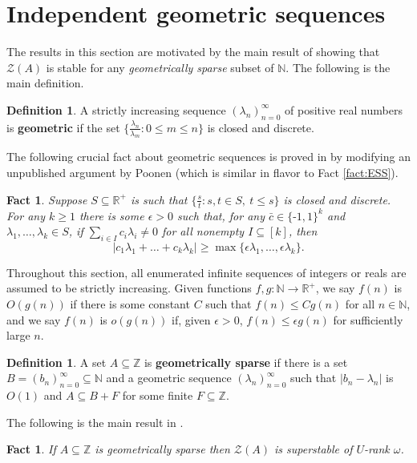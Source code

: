 \documentclass{amsart}
\def\seq{\subseteq}
\newcommand{\nv}{\text{-}}
\newcommand{\cbar}{\bar{c}}
\newcommand{\cZ}{\mathcal{Z}}
\def\N{\mathbb N}
\def\R{\mathbb R}
\def\Z{\mathbb Z}
\newtheorem{fact}[theorem]{Fact}
\theoremstyle{definition}
\newtheorem{definition}[theorem]{Definition}
\begin{document}
\section{Independent geometric sequences}

The results in this section are motivated by the main result of \cite{CoSS} showing that $\cZ(A)$ is stable for any \emph{geometrically sparse} subset of $\N$. The following is the main definition.

\begin{definition}\cite{CoSS}
A strictly increasing sequence $(\lambda_n)_{n=0}^\infty$ of positive real numbers is \textbf{geometric} if the set $\{\frac{\lambda_n}{\lambda_m}:0\leq m\leq n\}$ is closed and discrete.
\end{definition}

The following crucial fact about geometric sequences is proved in \cite[Lemma 7.3]{CoSS} by modifying an unpublished argument by Poonen (which is similar in flavor to Fact \ref{fact:ESS}).

\begin{fact}\label{fact:Poon}
Suppose $S\seq\R^+$ is such that $\{\frac{s}{t}:s,t\in S,~t\leq s\}$ is closed and discrete. For any $k\geq 1$ there is some $\epsilon>0$ such that, for any $\cbar\in\{\nv 1,1\}^k$ and $\lambda_1,\ldots,\lambda_k\in S$, if $\sum_{i\in I}c_i\lambda_i\neq 0$ for all nonempty $I\seq[k]$, then 
\[
|c_1\lambda_1+\ldots+c_k\lambda_k|\geq \max\{\epsilon\lambda_1,\ldots,\epsilon\lambda_k\}.
\]
\end{fact}


Throughout this section, all enumerated infinite sequences of integers or reals are assumed to be strictly increasing. Given functions $f,g:\N\to\R^+$, we say $f(n)$ is $O(g(n))$ if there is some constant $C$ such that $f(n)\leq Cg(n)$ for all $n\in\N$, and we say $f(n)$ is $o(g(n))$ if, given $\epsilon>0$, $f(n)\leq \epsilon g(n)$ for sufficiently large $n$. 

\begin{definition}\label{def:gs}\cite{CoSS}
A set $A\seq\Z$ is \textbf{geometrically sparse} if there is a set $B=(b_n)_{n=0}^\infty\seq\N$ and a geometric sequence $(\lambda_n)_{n=0}^\infty$ such that $|b_n-\lambda_n|$ is $O(1)$ and $A\seq B+F$ for some finite $F\seq\Z$.
\end{definition}

The following is the main result in \cite{CoSS}.

\begin{fact}\label{fact:CoSS}
If $A\seq\Z$ is geometrically sparse then $\cZ(A)$ is superstable of $U$-rank $\omega$.
\end{fact}
\end{document}
